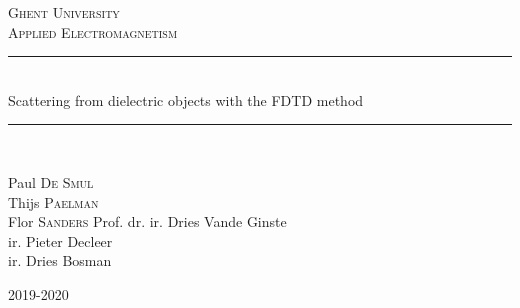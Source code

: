 \documentclass[11pt, a4paper]{article}
\begin{document}
\begin{titlepage}

\newcommand{\HRule}{\rule{\linewidth}{0.5mm}} %

\center %
 

\textsc{\LARGE Ghent University}\\[1.5cm] %
\textsc{\Large Applied Electromagnetism}\\[0.5cm] %
\HRule \\[0.4cm]
{\Huge Scattering from dielectric objects with the FDTD method}\\[0.5cm] %
\HRule \\[1.5cm]

 

\begin{minipage}{0.60\textwidth}
\begin{center} \large
Paul \textsc{De Smul}\\
Thijs \textsc{Paelman}\\
Flor \textsc{Sanders}\break
\newline
Prof. dr. ir. Dries Vande Ginste\\
ir. Pieter Decleer\\
ir. Dries Bosman\break
\end{center}
\end{minipage}

{\large 2019-2020}\\[2cm] %

\vfill %

\end{titlepage}
\end{document}
